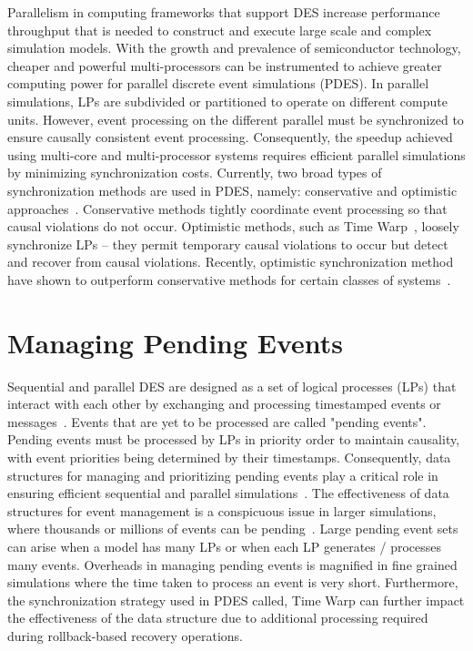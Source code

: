 Parallelism in computing frameworks that support DES increase
performance throughput that is needed to construct and execute large
scale and complex simulation models. With the growth and prevalence of
semiconductor technology, cheaper and powerful multi-processors can be
instrumented to achieve greater computing power for parallel discrete
event simulations (PDES).  In parallel simulations, LPs are subdivided
or partitioned to operate on different compute units.  However, event
processing on the different parallel must be synchronized to ensure
causally consistent event processing.  Consequently, the speedup
achieved using multi-core and multi-processor systems requires
efficient parallel simulations by minimizing synchronization costs.
Currently, two broad types of synchronization methods are used in
PDES, namely: conservative and optimistic approaches~\cite{jafer-13}.
Conservative methods tightly coordinate event processing so that
causal violations do not occur.  Optimistic methods, such as Time
Warp~\cite{jafer-13}, loosely synchronize LPs -- they permit temporary
causal violations to occur but detect and recover from causal
violations.  Recently, optimistic synchronization method have shown to
outperform conservative methods for certain classes of
systems~\cite{jafer-13}.


\section{Managing Pending Events}

Sequential and parallel DES are designed as a set of logical processes
(LPs) that interact with each other by exchanging and processing
timestamped events or messages~\cite{jafer-13}. Events that are yet to
be processed are called "pending events". Pending events must be
processed by LPs in priority order to maintain causality, with event
priorities being determined by their timestamps. Consequently, data
structures for managing and prioritizing pending events play a
critical role in ensuring efficient sequential and parallel
simulations~\cite{jones-86,ronngren-97,brown-88,franceschini-15}. The
effectiveness of data structures for event management is a conspicuous
issue in larger simulations, where thousands or millions of events can
be pending~\cite{carothers-2010,yeom-14}. Large pending event sets can
arise when a model has many LPs or when each LP generates / processes
many events. Overheads in managing pending events is magnified in fine
grained simulations where the time taken to process an event is very
short. Furthermore, the synchronization strategy used in PDES called,
Time Warp can further impact the effectiveness of the data structure
due to additional processing required during rollback-based recovery
operations.

